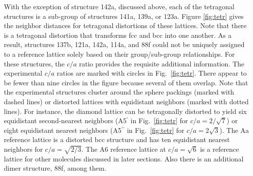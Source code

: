 \documentclass[preprint]{iucr}              %
\begin{document}
With the exception of structure 142a, discussed above, each of the
tetragonal structures is a sub-group of structures 141a, 139a, or
123a. Figure \ref{fig:tetr} gives the neighbor distances for
tetragonal distortions of these lattices.  Note that there is a
tetragonal distortion that transforms fcc and bcc into one another.
As a result, structures 137b, 121a, 142a, 114a, and 88f could not be
uniquely assigned to a reference lattice solely based on their
group/sub-group relationships.  For these structures, the $c/a$
ratio provides the requisite additional information.  The
experimental $c/a$ ratios are marked with circles in
Fig.~\ref{fig:tetr}. There appear to be fewer than nine circles in
the figure because several of them overlap. Note that the
experimental structures cluster around the sphere packings (marked
with dashed lines) or distorted lattices with equidistant neighbors
(marked with dotted lines). For instance, the diamond lattice can be
tetragonally distorted to yield six equidistant second-nearest
neighbors (A5$^\prime$ in Fig.\ \ref{fig:tetr} for $c/a=2/\sqrt{7}$)
or eight equidistant nearest neighbors (A5$^{\prime\prime}$ in Fig.\
\ref{fig:tetr} for $c/a=2\sqrt{3}$). The Aa reference lattice is a
distorted bcc structure and has ten equidistant nearest neighbors
for $c/a=\sqrt{2/3}$. The A6 reference lattice at $c/a=\sqrt{6}$ is
a reference lattice for other molecules discussed in later sections.
Also there is an additional dimer structure, 88f, among them.
\end{document}
